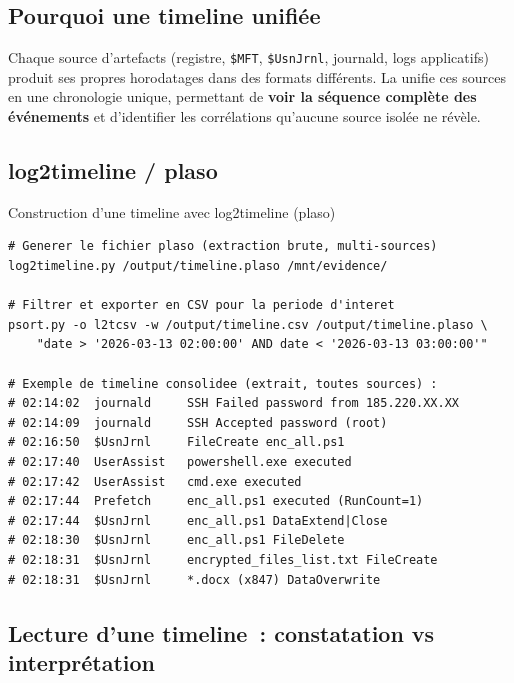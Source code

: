 \subsection{Pourquoi une timeline unifiée}

Chaque source d'artefacts (registre, \texttt{\$MFT}, \texttt{\$UsnJrnl},
journald, logs applicatifs) produit ses propres horodatages dans des
formats différents. La  unifie ces sources en une chronologie unique, permettant
de \textbf{voir la séquence complète des événements} et d'identifier
les corrélations qu'aucune source isolée ne révèle.

\subsection{log2timeline / plaso}

\begin{boxoutils}{Construction d'une timeline avec log2timeline (plaso)}
\begin{lstlisting}[language=bash_forensique]
# Generer le fichier plaso (extraction brute, multi-sources)
log2timeline.py /output/timeline.plaso /mnt/evidence/

# Filtrer et exporter en CSV pour la periode d'interet
psort.py -o l2tcsv -w /output/timeline.csv /output/timeline.plaso \
    "date > '2026-03-13 02:00:00' AND date < '2026-03-13 03:00:00'"

# Exemple de timeline consolidee (extrait, toutes sources) :
# 02:14:02  journald     SSH Failed password from 185.220.XX.XX
# 02:14:09  journald     SSH Accepted password (root)
# 02:16:50  $UsnJrnl     FileCreate enc_all.ps1
# 02:17:40  UserAssist   powershell.exe executed
# 02:17:42  UserAssist   cmd.exe executed
# 02:17:44  Prefetch     enc_all.ps1 executed (RunCount=1)
# 02:17:44  $UsnJrnl     enc_all.ps1 DataExtend|Close
# 02:18:30  $UsnJrnl     enc_all.ps1 FileDelete
# 02:18:31  $UsnJrnl     encrypted_files_list.txt FileCreate
# 02:18:31  $UsnJrnl     *.docx (x847) DataOverwrite
\end{lstlisting}
\end{boxoutils}

\subsection{Lecture d'une timeline~: constatation vs interprétation}

